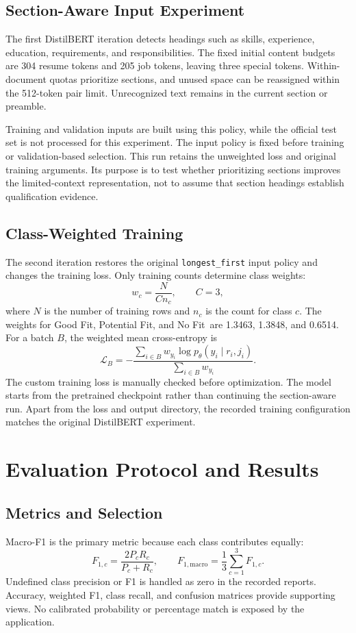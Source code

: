 \documentclass[conference,a4paper]{IEEEtran}
\newcommand{\GF}{Good Fit}
\newcommand{\PF}{Potential Fit}
\newcommand{\NF}{No Fit}
\begin{document}
\subsection{Section-Aware Input Experiment}
The first DistilBERT iteration detects headings such as skills, experience, education, requirements, and responsibilities. The fixed initial content budgets are 304 resume tokens and 205 job tokens, leaving three special tokens. Within-document quotas prioritize sections, and unused space can be reassigned within the 512-token pair limit. Unrecognized text remains in the current section or preamble.

Training and validation inputs are built using this policy, while the official test set is not processed for this experiment. The input policy is fixed before training or validation-based selection. This run retains the unweighted loss and original training arguments. Its purpose is to test whether prioritizing sections improves the limited-context representation, not to assume that section headings establish qualification evidence.

\subsection{Class-Weighted Training}
The second iteration restores the original \texttt{longest\_first} input policy and changes the training loss. Only training counts determine class weights:
\begin{equation}
w_c=\frac{N}{C n_c},\qquad C=3,
\end{equation}
where $N$ is the number of training rows and $n_c$ is the count for class $c$. The weights for \GF, \PF, and \NF\ are 1.3463, 1.3848, and 0.6514. For a batch $B$, the weighted mean cross-entropy is
\begin{equation}
\mathcal{L}_{B}=-\frac{\sum_{i\in B} w_{y_i}\log p_\theta(y_i\mid r_i,j_i)}{\sum_{i\in B} w_{y_i}}.
\end{equation}
The custom training loss is manually checked before optimization. The model starts from the pretrained checkpoint rather than continuing the section-aware run. Apart from the loss and output directory, the recorded training configuration matches the original DistilBERT experiment.

\section{Evaluation Protocol and Results}
\subsection{Metrics and Selection}
Macro-F1 is the primary metric because each class contributes equally:
\begin{equation}
F_{1,c}=\frac{2P_cR_c}{P_c+R_c},\qquad
F_{1,\mathrm{macro}}=\frac{1}{3}\sum_{c=1}^{3}F_{1,c}.
\end{equation}
Undefined class precision or F1 is handled as zero in the recorded reports. Accuracy, weighted F1, class recall, and confusion matrices provide supporting views. No calibrated probability or percentage match is exposed by the application.
\end{document}
